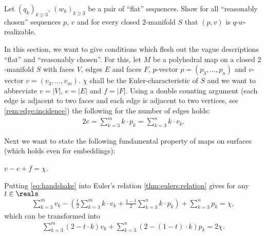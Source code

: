 \begin{problem}\label{prob:eberhard:unspecified}
  Let $(q_k)_{k \geq 3}$, $(w_k)_{k \geq 3}$ be a pair of ``flat'' sequences. Show for all ``reasonably chosen'' sequences $p$, $v$ and for every closed $2$-manifold $S$ that $(p, v)$ is $q$-$w$-realizable.
\end{problem}


In this section, we want to give conditions which flesh out the vague descriptions ``flat'' and ``reasonably chosen''. 
For this, let $M$ be a polyhedral map on a closed $2$-manifold $S$ with faces $V$, edges $E$ and faces $F$, $p$-vector $p = (p_3, \dots, p_n)$ and $v$-vector $v = (v_3, \dots, v_m)$. $\chi$ shall be the {\sc Euler}-characteristic of $S$ and we want to abbreviate $v = |V|$, $e = |E|$ and $f = |F|$. Using a double counting argument (each edge is adjacent to two faces and each edge is adjacent to two vertices, see \autoref{rem:edge:incidence}) the following for the number of edges holds:
\begin{align}
  2e = \sum_{k=3}^{m} k \cdot p_k = \sum_{k=3}^{n} k \cdot v_k \label{eq:handshake}.
\end{align}

Next we want to state the following fundamental property of maps on surfaces (which holds even for embeddings):
\begin{theorem}\label{thm:eulers:relation} $v - e + f = \chi$.
\end{theorem}

Putting \autoref{eq:handshake} into Euler's relation \autoref{thm:eulers:relation} gives for any $t \in \reals$ 
\begin{align*}
  \sum_{k=3}^m v_k - \left(\frac{t}{2} \sum_{k=3}^m k \cdot v_k + \frac{1-t}{2} \sum_{k=3}^n k \cdot p_k \right) + \sum_{k=3}^n p_k = \chi,
\end{align*}
which can be transformed into
\begin{align}
  \sum_{k=3}^m (2 - t \cdot k ) v_k + \sum_{k=3}^n ( 2 - (1 - t) \cdot k ) p_k = 2 \chi. \label{eq:general:vp:relation}
\end{align}

